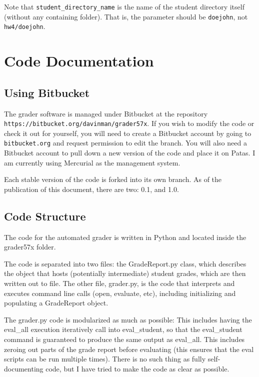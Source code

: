 \documentclass[12pt]{article}
\begin{document}
\vspace{5pt}

Note that \texttt{student\_directory\_name} is the name of the student directory itself (without any containing folder). That is, the parameter should be \texttt{doejohn}, not \texttt{hw4/doejohn}.

\section{Code Documentation} \label{sec:documentation}

\subsection{Using Bitbucket} \label{sec:bitbucket}

The grader software is managed under Bitbucket at the repository \\ \texttt{https://bitbucket.org/davinman/grader57x}. If you wish to modify the code or check it out for yourself, you will need to create a Bitbucket account by going to \texttt{bitbucket.org} and request permission to edit the branch. You will also need a Bitbucket account to pull down a new version of the code and place it on Patas. I am currently using Mercurial as the management system.

Each stable version of the code is forked into its own branch. As of the publication of this document, there are two: 0.1, and 1.0.

\subsection{Code Structure} \label{sec:structure}

The code for the automated grader is written in Python and located inside the grader57x folder.

The code is separated into two files: the GradeReport.py class, which describes the object that hosts (potentially intermediate) student grades, which are then written out to file. The other file, grader.py, is the code that interprets and executes command line calls (open, evaluate, etc), including initializing and populating a GradeReport object.

The grader.py code is modularized as much as possible: This includes having the eval\_all execution iteratively call into eval\_student, so that the eval\_student command is guaranteed to produce the same output as eval\_all. This includes zeroing out parts of the grade report before evaluating (this ensures that the eval scripts can be run multiple times). There is no such thing as fully self-documenting code, but I have tried to make the code as clear as possible.
\end{document}
